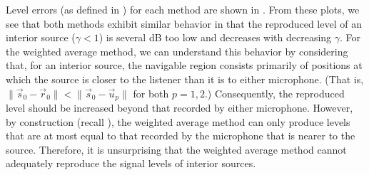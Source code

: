 
Level errors (as defined in ) for each method are shown in .
From these plots, we see that both methods exhibit similar behavior in that the reproduced level of an interior source ($\gamma < 1$) is several dB too low and decreases with decreasing $\gamma$.
For the weighted average method, we can understand this behavior by considering that, for an interior source, the navigable region consists primarily of positions at which the source is closer to the listener than it is to either microphone.
(That is, $\|\vec{s}_0 - \vec{r}_0\| < \|\vec{s}_0 - \vec{u}_p\|$ for both $p = 1, 2$.)
Consequently, the reproduced level should be increased beyond that recorded by either microphone.
However, by construction (recall ), the weighted average method can only produce levels that are at most equal to that recorded by the microphone that is nearer to the source.
Therefore, it is unsurprising that the weighted average method cannot adequately reproduce the signal levels of interior sources.


